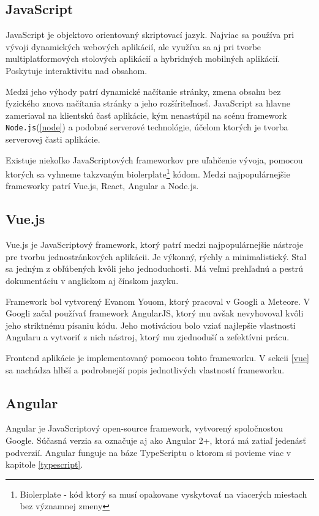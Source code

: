 \subsection{JavaScript}
JavaScript je objektovo orientovaný skriptovací jazyk. Najviac sa používa pri vývoji dynamických webových aplikácií, ale využíva sa aj pri tvorbe multiplatformových stolových aplikácií a hybridných mobilných aplikácií. Poskytuje interaktivitu nad obsahom. 

Medzi jeho výhody patrí dynamické načítanie stránky, zmena obsahu bez fyzického znova načítania stránky a jeho rozšíriteľnosť. JavaScript sa hlavne zameriaval na klientskú časť aplikácie, kým nenastúpil na scénu framework \texttt{Node.js}(\ref{node}) a podobné serverové technológie, účelom ktorých je tvorba serverovej časti aplikácie.

Existuje niekoľko JavaScriptových frameworkov pre uľahčenie vývoja, pomocou ktorých sa vyhneme takzvaným biolerplate\footnote{Biolerplate - kód ktorý sa musí opakovane vyskytovať na viacerých miestach bez významnej zmeny} kódom. Medzi najpopulárnejšie frameworky patrí Vue.js, React, Angular a Node.js.

\subsection{Vue.js}
Vue.js\cite{vue-guide} je JavaScriptový framework, ktorý patrí medzi najpopulárnejšie nástroje pre tvorbu jednostránkových aplikácii. Je výkonný, rýchly a minimalistický. Stal sa jedným z obľúbených kvôli jeho jednoduchosti. Má veľmi prehľadnú a pestrú dokumentáciu v anglickom aj čínskom jazyku.

Framework bol vytvorený Evanom Youom, ktorý pracoval v Googli a Meteore. V Googli začal používať framework AngularJS, ktorý mu avšak nevyhovoval kvôli jeho striktnému písaniu kódu. Jeho motiváciou bolo vziať najlepšie vlastnosti Angularu a vytvoriť z nich nástroj, ktorý mu zjednoduší a zefektívni prácu.

Frontend aplikácie je implementovaný pomocou tohto frameworku. V sekcii \ref{vue} sa nachádza hlbší a podrobnejší popis jednotlivých vlastností frameworku.

\subsection{Angular}
Angular\cite{angular} je JavaScriptový open-source framework, vytvorený spoločnostou Google. Súčasná verzia sa označuje aj ako Angular 2+, ktorá má zatiaľ jedenásť podverzií. Angular funguje na báze TypeScriptu o ktorom si povieme viac v kapitole \ref{typescript}.

